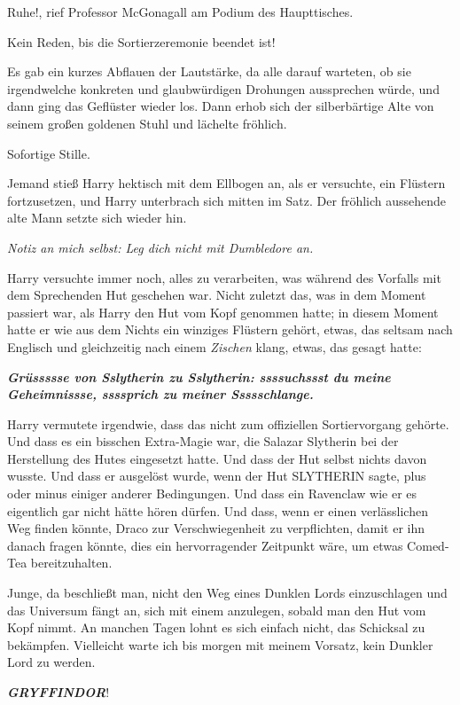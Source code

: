 \glqq{}Ruhe!\grqq{}, rief Professor McGonagall am Podium des Haupttisches.

\glqq{}Kein Reden, bis die Sortierzeremonie beendet ist!\grqq{}

Es gab ein kurzes Abflauen der Lautstärke, da alle darauf warteten, ob sie
irgendwelche konkreten und glaubwürdigen Drohungen aussprechen würde, und dann
ging das Geflüster wieder los. Dann erhob sich der silberbärtige Alte von seinem
großen goldenen Stuhl und lächelte fröhlich.

Sofortige Stille.

Jemand stieß Harry hektisch mit dem Ellbogen an, als er versuchte, ein Flüstern
fortzusetzen, und Harry unterbrach sich mitten im Satz. Der fröhlich aussehende
alte Mann setzte sich wieder hin.

\emph{Notiz an mich selbst: Leg dich nicht mit Dumbledore an.}

Harry versuchte immer noch, alles zu verarbeiten, was während des Vorfalls mit
dem Sprechenden Hut geschehen war. Nicht zuletzt das, was in dem Moment passiert
war, als Harry den Hut vom Kopf genommen hatte; in diesem Moment hatte er wie
aus dem Nichts ein winziges Flüstern gehört, etwas, das seltsam nach Englisch
und gleichzeitig nach einem \emph{Zischen} klang, etwas, das gesagt hatte:

\textbf{\emph{\glqq{}Grüssssse von Sslytherin zu Sslytherin: ssssuchssst du
meine Geheimnissse, ssssprich zu meiner Ssssschlange.\grqq{}} }

Harry vermutete irgendwie, dass das nicht zum offiziellen Sortiervorgang
gehörte. Und dass es ein bisschen Extra-Magie war, die Salazar Slytherin bei der
Herstellung des Hutes eingesetzt hatte. Und dass der Hut selbst nichts davon
wusste. Und dass er ausgelöst wurde, wenn der Hut \glqq{}SLYTHERIN\grqq{} sagte,
plus oder minus einiger anderer Bedingungen. Und dass ein Ravenclaw wie er es
eigentlich gar nicht hätte hören dürfen. Und dass, wenn er einen verlässlichen
Weg finden könnte, Draco zur Verschwiegenheit zu verpflichten, damit er ihn
danach fragen könnte, dies ein hervorragender Zeitpunkt wäre, um etwas Comed-Tea
bereitzuhalten.

Junge, da beschließt man, nicht den Weg eines Dunklen Lords einzuschlagen und
das Universum fängt an, sich mit einem anzulegen, sobald man den Hut vom Kopf
nimmt. An manchen Tagen lohnt es sich einfach nicht, das Schicksal zu bekämpfen.
Vielleicht warte ich bis morgen mit meinem Vorsatz, kein Dunkler Lord zu werden.

\glqq{}\textbf{\emph{GRYFFINDOR}}!\grqq{}

